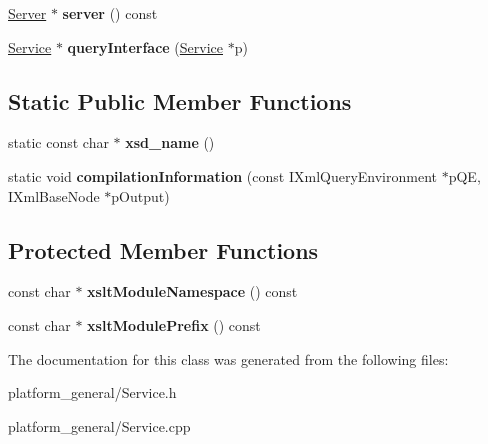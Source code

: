 \begin{DoxyCompactItemize}
\item 
\hypertarget{classgeneral__server_1_1Service_ae649bc65957be6373d36df2144cc7d79}{\hyperlink{classgeneral__server_1_1Server}{\-Server} $\ast$ {\bfseries server} () const }\label{classgeneral__server_1_1Service_ae649bc65957be6373d36df2144cc7d79}

\item 
\hypertarget{classgeneral__server_1_1Service_a9e2af84bd5c00ac7aed08f5308a1d750}{\hyperlink{classgeneral__server_1_1Service}{\-Service} $\ast$ {\bfseries query\-Interface} (\hyperlink{classgeneral__server_1_1Service}{\-Service} $\ast$p)}\label{classgeneral__server_1_1Service_a9e2af84bd5c00ac7aed08f5308a1d750}

\end{DoxyCompactItemize}
\subsection*{\-Static \-Public \-Member \-Functions}
\begin{DoxyCompactItemize}
\item 
\hypertarget{classgeneral__server_1_1Service_a16df2a7fdf9f7687af88150f76432656}{static const char $\ast$ {\bfseries xsd\-\_\-name} ()}\label{classgeneral__server_1_1Service_a16df2a7fdf9f7687af88150f76432656}

\item 
\hypertarget{classgeneral__server_1_1Service_a65029b6ef0b6816e1cf85c0e4df4d835}{static void {\bfseries compilation\-Information} (const \-I\-Xml\-Query\-Environment $\ast$p\-Q\-E, \-I\-Xml\-Base\-Node $\ast$p\-Output)}\label{classgeneral__server_1_1Service_a65029b6ef0b6816e1cf85c0e4df4d835}

\end{DoxyCompactItemize}
\subsection*{\-Protected \-Member \-Functions}
\begin{DoxyCompactItemize}
\item 
\hypertarget{classgeneral__server_1_1Service_ad33ede84511cec78ea317cf28e7df9f2}{const char $\ast$ {\bfseries xslt\-Module\-Namespace} () const }\label{classgeneral__server_1_1Service_ad33ede84511cec78ea317cf28e7df9f2}

\item 
\hypertarget{classgeneral__server_1_1Service_aedfb62588053cf35db1c7e5b9395aa33}{const char $\ast$ {\bfseries xslt\-Module\-Prefix} () const }\label{classgeneral__server_1_1Service_aedfb62588053cf35db1c7e5b9395aa33}

\end{DoxyCompactItemize}


\-The documentation for this class was generated from the following files\-:\begin{DoxyCompactItemize}
\item 
platform\-\_\-general/\-Service.\-h\item 
platform\-\_\-general/\-Service.\-cpp\end{DoxyCompactItemize}

